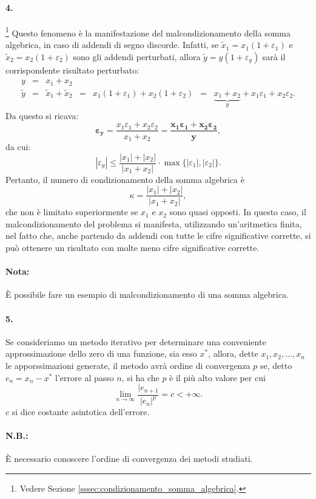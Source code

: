 \paragraph{4.}\footnote{Vedere Sezione \ref{sssec:condizionamento_somma_algebrica}.} Questo fenomeno è la manifestazione del malcondizionamento della somma algebrica, in caso di addendi di segno discorde. Infatti, se $\tilde x_1 = x_1 (1+\varepsilon_1)$ e $\tilde x_2 = x_2 (1 + \varepsilon_2)$ sono gli addendi perturbati, allora $\tilde y = y (1 + \varepsilon_y)$ sarà il corrispondente risultato perturbato:
\begin{equation*}
	\begin{matrix}
		y &=& x_1 + x_2\\
		\tilde y &=& \tilde x_1 + \tilde x_2 &=& x_1(1+\varepsilon_1) + x_2 (1+\varepsilon_2) &=& \underbrace{x_1 + x_2}_{y} + x_1 \varepsilon_1 + x_2 \varepsilon_2.
	\end{matrix}
\end{equation*}
Da questo si ricava:
\begin{equation*}
	\boldsymbol{\varepsilon_y} = \frac{x_1\varepsilon_1+x_2\varepsilon_2}{x_1+x_2}= \boldsymbol{\frac{x_1\varepsilon_1+x_2\varepsilon_2}{y}},
\end{equation*}
da cui:
\begin{equation*}
	|\varepsilon_y|\leq \frac{|x_1|+|x_2|}{|x_1+x_2|} \cdot \max{\{|\varepsilon_1|,|\varepsilon_2|\}}.
\end{equation*}
Pertanto, il numero di condizionamento della somma algebrica è
\begin{equation*}
	\kappa=\frac{|x_1|+|x_2|}{|x_1+x_2|},
\end{equation*}
che non è limitato superiormente se $x_1$ e $x_2$ sono quasi opposti. In questo caso, il malcondizionamento del problema si manifesta, utilizzando un'aritmetica finita, nel fatto che, anche partendo da addendi con tutte le cifre significative corrette, si può ottenere un risultato con molte meno cifre significative corrette.
\paragraph{Nota:} È possibile fare un esempio di malcondizionamento di una somma algebrica.

\paragraph{5.} Se consideriamo un metodo iterativo per determinare una conveniente approssimazione dello zero di una funzione, sia esso $x^*$, allora, dette $x_1, x_2,\hdots, x_n$ le apporssimazioni generate, il metodo avrà ordine di convergenza $p$ se, detto $e_n=x_n-x^*$ l'errore al passo $n$, si ha che  $p$ è il più alto valore per cui
\begin{equation*}
	\lim_{n\rightarrow\infty}\frac{|e_{n+1}}{|e_n|^p}=c<+\infty.
\end{equation*}
$c$ si dice costante asintotica dell'errore.
\paragraph{N.B.:} È necessario conoscere l'ordine di convergenza dei metodi studiati.